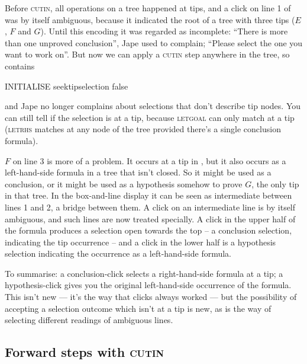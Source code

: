 Before \textsc{cutin}, all operations on a tree happened at tips, and a click on line 1 of  was by itself ambiguous, because it indicated the root of a tree with three tips ($E$, $F$ and $G$). Until this encoding it was regarded as incomplete: ``There is more than one unproved conclusion'', Jape used to complain; ``Please select the one you want to work on''. But now we can apply a \textsc{cutin} step anywhere in the tree, so  contains
\begin{japeish}
INITIALISE seektipselection false
\end{japeish}
and Jape no longer complains about selections that don't describe tip nodes. You can still tell if the selection is at a tip, because \textsc{letgoal} can only match at a tip (\textsc{letrhs} matches at any node of the tree provided there's a single conclusion formula).

$F$ on line 3 is more of a problem. It occurs at a tip in , but it also occurs as a left-hand-side formula in a tree that isn't closed. So it might be used as a conclusion, or it might be used as a hypothesis somehow to prove $G$, the only tip in that tree. In the box-and-line display it can be seen as intermediate between lines 1 and 2, a bridge between them. A click on an intermediate line is by itself ambiguous, and such lines are now treated specially. A click in the upper half of the formula produces a selection open towards the top -- a conclusion selection, indicating the tip occurrence -- and a click in the lower half is a hypothesis selection indicating the occurrence as a left-hand-side formula.

To summarise: a conclusion-click selects a right-hand-side formula at a tip; a hypothesis-click gives you the original left-hand-side occurrence of the formula. This isn't new --- it's the way that clicks always worked --- but the possibility of accepting a selection outcome which isn't at a tip is new, as is the way of selecting different readings of ambiguous lines.

\subsection{Forward steps with \textsc{cutin}}
\label{sec:I2L:forwardCUTIN}

